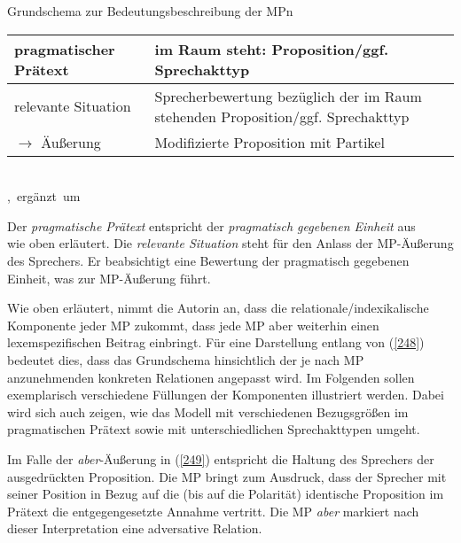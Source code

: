 \begin{exe}
	\ex\label{248} Grundschema zur Bedeutungsbeschreibung der MPn\\[-0.5em]
     \begin{tabular}[t]{|l|p{7cm}|}
     	\hline
      	pragmatischer Prätext & im Raum steht: Proposition/ggf. Sprechakttyp\\
        \hline
        relevante Situation & Sprecherbewertung bezüglich der im Raum stehenden Proposition/ggf. Sprechakttyp\\
        \hline
        $\rightarrow$ Äußerung & Modifizierte Proposition mit Partikel\\
        \hline
     \end{tabular}\\
     \hbox{}\hfill\hbox{\citet[84]{Diewald1998}, ergänzt um \citet[418]{Diewald2006}}
\end{exe}
Der \textit{pragmatische Prätext}  entspricht der \textit{pragmatisch gegebenen Einheit}  aus\\ \citet{Diewald2006} wie oben erläutert. Die \textit{relevante Situation}  steht für den Anlass der MP-Äußerung des Sprechers. Er beabsichtigt eine Bewertung der pragmatisch gegebenen Einheit, was zur MP-Äußerung führt.

Wie oben erläutert, nimmt die Autorin an, dass die relationale/indexikalische Komponente jeder MP zukommt, dass jede MP aber weiterhin einen lexemspe\-zifischen Beitrag einbringt. Für eine Darstellung entlang von (\ref{248}) bedeutet dies, dass das Grundschema hinsichtlich der je nach MP anzunehmenden konkreten Relationen angepasst wird. Im Folgenden sollen exemplarisch verschiedene Füllungen der Komponenten illustriert werden. Dabei wird sich auch zeigen, wie das Modell mit verschiedenen Bezugsgrößen im pragmatischen Prätext sowie mit unterschiedlichen Sprechakttypen umgeht.

Im Falle der \textit{aber}-Äußerung in (\ref{249}) entspricht die Haltung des Sprechers der ausgedrückten Proposition. Die MP bringt zum Ausdruck, dass der Sprecher mit seiner Position in Bezug auf die (bis auf die Polarität) identische Proposition im Prätext die entgegengesetzte Annahme vertritt. Die MP \textit{aber} markiert nach dieser Interpretation eine adversative Relation.

